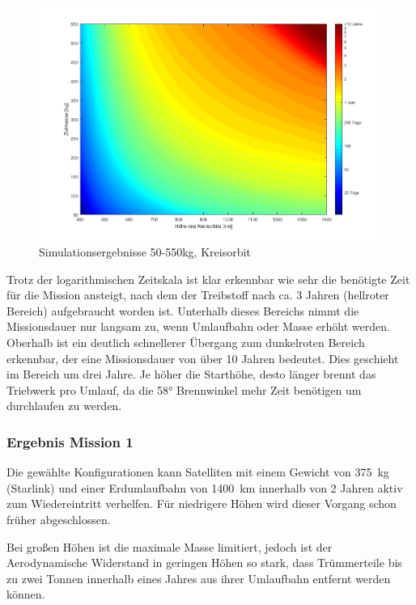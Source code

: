 \begin{figure}[h!]
	\centering
		\includegraphics[width=1.00\textwidth]{./graphics/GMAT/GMAT_Mass_over_Height_550.png}
		\caption{Simulationsergebnisse 50-550kg, Kreisorbit}
	\label{fig:GMAT_Mass_over_Height_550}
\end{figure}

	Trotz der logarithmischen Zeitskala ist klar erkennbar wie sehr die benötigte Zeit für die Mission ansteigt, nach dem der Treibstoff nach ca. \num{3} Jahren (hellroter Bereich) aufgebraucht worden ist. Unterhalb dieses Bereichs nimmt die Missionsdauer nur langsam zu, wenn Umlaufbahn oder Masse erhöht werden. Oberhalb ist ein deutlich schnellerer Übergang zum dunkelroten Bereich erkennbar, der eine Missionsdauer von über \num{10} Jahren bedeutet. Dies geschieht im Bereich um drei Jahre. Je höher die Starthöhe, desto länger brennt das Triebwerk pro Umlauf, da die \num{58}° Brennwinkel mehr Zeit benötigen um durchlaufen zu werden. 

\subsubsection{Ergebnis Mission 1}

	Die gewählte Konfigurationen kann Satelliten mit einem Gewicht von \SI{375}{\kilogram} (Starlink) und einer Erdumlaufbahn von \SI{1400}{\kilo\metre} innerhalb von \num{2} Jahren  aktiv zum Wiedereintritt verhelfen. Für niedrigere Höhen wird dieser Vorgang schon früher abgeschlossen. 

	Bei großen Höhen ist die maximale Masse limitiert, jedoch ist der Aerodynamische Widerstand in geringen Höhen so stark, dass Trümmerteile bis zu zwei Tonnen innerhalb eines Jahres aus ihrer Umlaufbahn entfernt werden können. 

